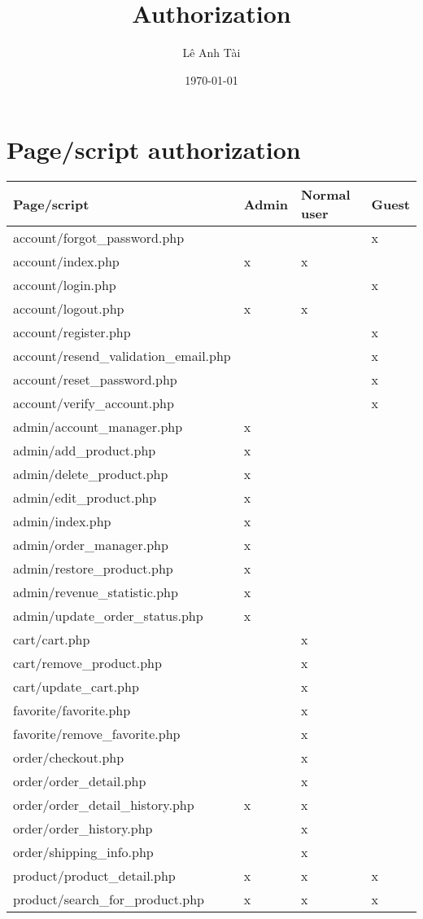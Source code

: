\documentclass[11pt]{article}
\author{Lê Anh Tài}
\date{\today}
\title{Authorization}
\begin{document}
\maketitle
\tableofcontents

\section{Page/script authorization}
\label{sec:orgc949eda}
\begin{center}
\begin{tabular}{llll}
Page/script & Admin & Normal user & Guest\\
\hline
account/forgot\_password.php &  &  & x\\
account/index.php & x & x & \\
account/login.php &  &  & x\\
account/logout.php & x & x & \\
account/register.php &  &  & x\\
account/resend\_validation\_email.php &  &  & x\\
account/reset\_password.php &  &  & x\\
account/verify\_account.php &  &  & x\\
admin/account\_manager.php & x &  & \\
admin/add\_product.php & x &  & \\
admin/delete\_product.php & x &  & \\
admin/edit\_product.php & x &  & \\
admin/index.php & x &  & \\
admin/order\_manager.php & x &  & \\
admin/restore\_product.php & x &  & \\
admin/revenue\_statistic.php & x &  & \\
admin/update\_order\_status.php & x &  & \\
cart/cart.php &  & x & \\
cart/remove\_product.php &  & x & \\
cart/update\_cart.php &  & x & \\
favorite/favorite.php &  & x & \\
favorite/remove\_favorite.php &  & x & \\
order/checkout.php &  & x & \\
order/order\_detail.php &  & x & \\
order/order\_detail\_history.php & x & x & \\
order/order\_history.php &  & x & \\
order/shipping\_info.php &  & x & \\
product/product\_detail.php & x & x & x\\
product/search\_for\_product.php & x & x & x\\
\end{tabular}
\end{center}
\end{document}
